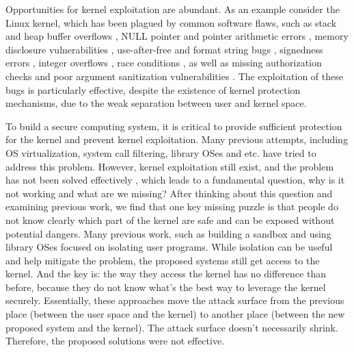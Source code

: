 Opportunities for kernel exploitation are abundant. As an example consider the Linux kernel, 
which has been plagued by common software flaws, such as stack and heap buffer overflows 
\cite{CVE:20093234, CVE:20131828, CVE:20132892}, NULL pointer and pointer arithmetic errors 
\cite{CVE:20050736, CVE:20092698}, memory disclosure vulnerabilities 
\cite{CVE:20093002, CVE:20104073}, use-after-free and format string bugs 
\cite{CVE:20132852, CVE:20134343}, signedness errors \cite{CVE:20103437, CVE:20132094}, 
integer overflows \cite{CVE:20050736, CVE:20102959}, race conditions 
\cite{CVE:20091527, CVE:20093547}, as well as missing authorization checks and 
poor argument sanitization vulnerabilities 
\cite{CVE:20103904, CVE:20104347, CVE:20120946, CVE:20130268}. 
The exploitation of these bugs is particularly effective, 
despite the existence of kernel protection mechanisms, 
due to the weak separation between user and kernel space.

To build a secure computing system, it is critical to provide sufficient protection for the kernel and 
prevent kernel exploitation. Many previous attempts, including OS virtualization, 
system call filtering, library OSes and etc. have tried to address this problem. However, 
kernel exploitation still exist, and the problem has not been solved 
effectively 
, which leads to a 
fundamental question, why is it not working and what are we missing? 
After thinking about this
question and examining previous work, we find that one key missing puzzle is that people do not know 
clearly which part of the kernel are safe and can be exposed without potential dangers. 
Many previous
work, such as building a sandbox and using library OSes focused on isolating user programs. While isolation 
can be useful and help mitigate the problem, the proposed systems still get access to the kernel. 
And the key is: the way they access the kernel has no difference than before, because they do not 
know what's the best way to leverage the kernel securely. Essentially, these approaches move
the attack surface from the previous place (between the user space and the kernel) to another place 
(between the new proposed system and the kernel). The attack surface
doesn't necessarily shrink.   
Therefore, the proposed solutions were not effective. 

